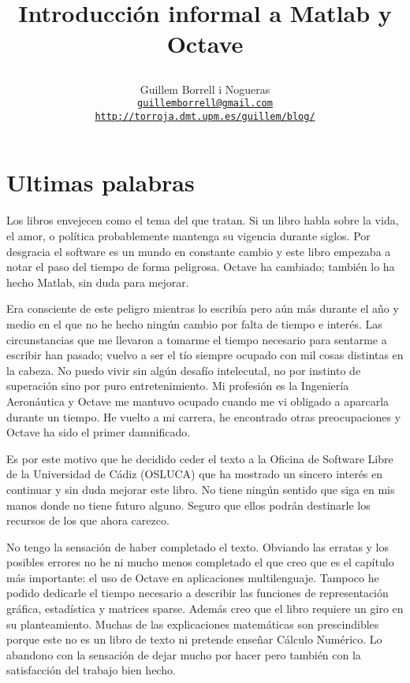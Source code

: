 \documentclass[10pt,fleqn,a4]{book}
\begin{document}
\title{\begin{Huge}Introducción informal a Matlab y Octave\end{Huge}}


\author{Guillem Borrell i Nogueras\\
  \href{mailto:guillemborrell@gmail.com}
  {\texttt{guillemborrell@gmail.com}}\\
  \texttt{\url{http://torroja.dmt.upm.es/guillem/blog/}}\\
}

\maketitle


\chapter*{Ultimas palabras}

Los libros envejecen como el tema del que tratan.  Si un libro habla
sobre la vida, el amor, o política probablemente mantenga su vigencia
durante siglos.  Por desgracia el software es un mundo en constante
cambio y este libro empezaba a notar el paso del tiempo de forma
peligrosa. Octave ha cambiado; también lo ha hecho Matlab, sin duda
para mejorar.

Era consciente de este peligro mientras lo escribía pero aún más
durante el año y medio en el que no he hecho ningún cambio por falta
de tiempo e interés. Las circunstancias que me llevaron a tomarme el
tiempo necesario para sentarme a escribir han pasado; vuelvo a ser el
tío siempre ocupado con mil cosas distintas en la cabeza.  No puedo
vivir sin algún desafío intelecutal, no por instinto de superación
sino por puro entretenimiento. Mi profesión es la Ingeniería
Aeronáutica y Octave me mantuvo ocupado cuando me vi obligado a
aparcarla durante un tiempo.  He vuelto a mi carrera, he encontrado
otras preocupaciones y Octave ha sido el primer damnificado.

Es por este motivo que he decidido ceder el texto a la Oficina de
Software Libre de la Universidad de Cádiz (OSLUCA) que ha mostrado un
sincero interés en continuar y sin duda mejorar este libro.  No tiene
ningún sentido que siga en mis manos donde no tiene futuro
alguno. Seguro que ellos podrán destinarle los recursos de los que
ahora carezco.

No tengo la sensación de haber completado el texto.  Obviando las
erratas y los posibles errores no he ni mucho menos completado el que
creo que es el capítulo más importante: el uso de Octave en
aplicaciones multilenguaje.  Tampoco he podido dedicarle el tiempo
necesario a describir las funciones de representación gráfica,
estadística y matrices sparse. Además creo que el libro requiere un
giro en su planteamiento. Muchas de las explicaciones matemáticas son
prescindibles porque este no es un libro de texto ni pretende enseñar
Cálculo Numérico. Lo abandono con la sensación de dejar mucho por
hacer pero también con la satisfacción del trabajo bien hecho.
\end{document}
